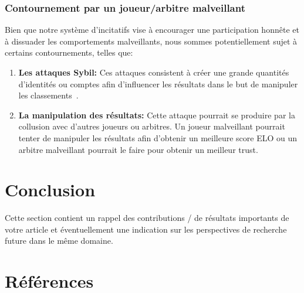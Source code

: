 \documentclass[journal, a4paper]{IEEEtran}
\begin{document}
		\begin{center}
			\subsubsection*{\textbf{Contournement par un joueur/arbitre malveillant}}\label{subsubsec:contournement-par-un-joueur-malveillant}
		\end{center}
			Bien que notre système d'incitatifs vise à encourager une participation honnête et à dissuader les comportements malveillants,
			nous sommes potentiellement sujet à certains contournements, telles que:
			\begin{enumerate}
				\item \textbf{Les attaques Sybil:} Ces attaques consistent à créer une grande quantités d'identités ou comptes
					afin d'influencer les résultats dans le but de manipuler les classements~\cite{Sybil}.
				\item \textbf{La manipulation des résultats:} Cette attaque pourrait se produire par la collusion avec d'autres joueurs ou arbitres.
					Un joueur malveillant pourrait tenter de manipuler les résultats afin d'obtenir un meilleure score ELO
					ou un arbitre malveillant pourrait le faire pour obtenir un meilleur trust.
			\end{enumerate}


\section{Conclusion}\label{sec:conclusion}
	Cette section contient un rappel des contributions / de résultats importants de votre article et éventuellement une indication sur les perspectives de recherche future dans le même domaine.

\newpage
\section*{\textbf{Références}}\label{sec:références}
	\printbibliography[heading=none]

\newpage
		
\appendices


\end{document}
